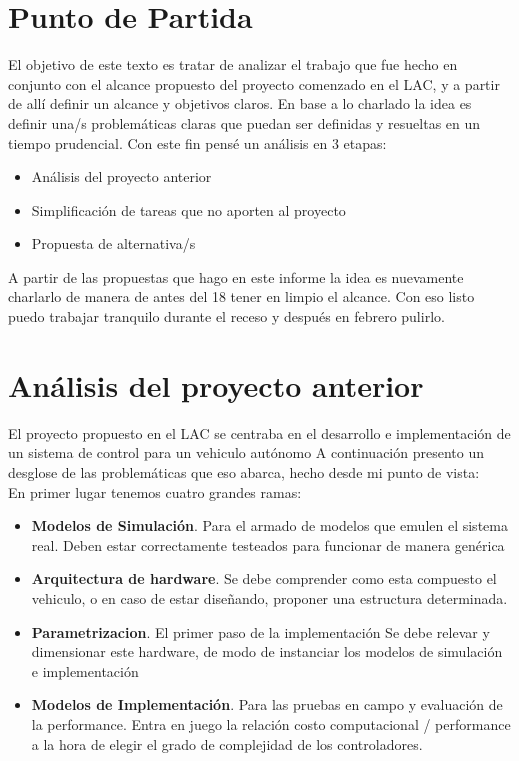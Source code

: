 \documentclass[12pt,a4paper,fleqn]{report}
\begin{document}
	\section*{Punto de Partida}
	El objetivo de este texto es tratar de analizar el trabajo que fue hecho en conjunto con el alcance propuesto del proyecto comenzado en el LAC, y a partir de allí definir un alcance y objetivos claros. En base a lo charlado la idea es definir una/s problemáticas claras que puedan ser definidas y resueltas en un tiempo prudencial. Con este fin pensé un análisis en 3 etapas:
	\begin{itemize}
		\item Análisis del proyecto anterior
		\item Simplificación de tareas que no aporten al proyecto
		\item Propuesta de alternativa/s
	\end{itemize}

	A partir de las propuestas que hago en este informe la idea es nuevamente charlarlo de manera de antes del 18 tener en limpio el alcance. Con eso listo puedo trabajar tranquilo durante el receso y después en febrero pulirlo.
	
	\section*{Análisis del proyecto anterior}
	El proyecto propuesto en el LAC se centraba en el desarrollo e implementación de un sistema de control para un vehiculo autónomo A continuación presento un desglose de las problemáticas que eso abarca, hecho desde mi punto de vista: \\
	En primer lugar tenemos cuatro grandes ramas:
	\begin{itemize}	
		\item \textbf{Modelos de Simulación}. Para el armado de modelos que emulen el sistema real. Deben estar correctamente testeados para funcionar de manera genérica
		\item \textbf{Arquitectura de hardware}. Se debe comprender como esta compuesto el vehiculo, o en caso de estar diseñando, proponer una estructura determinada.
		\item \textbf{Parametrizacion}. El primer paso de la implementación Se debe relevar y dimensionar este hardware, de modo de instanciar los modelos de simulación e implementación
		\item \textbf{Modelos de Implementación}. Para las pruebas en campo y evaluación de la performance. Entra en juego la relación costo computacional / performance a la hora de elegir el grado de complejidad de los controladores.
	\end{itemize}
\end{document}
